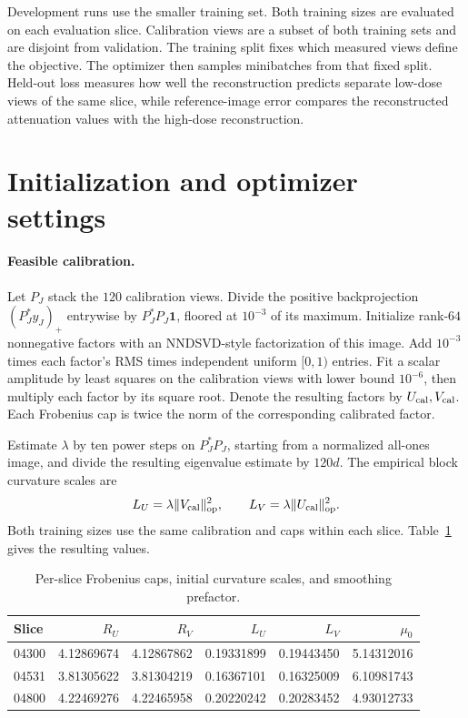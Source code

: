 \documentclass[11pt]{article}
\begin{document}
Development runs use the smaller training set. Both training sizes are evaluated on each evaluation slice. Calibration views are a subset of both training sets and are disjoint from validation. The training split fixes which measured views define the objective. The optimizer then samples minibatches from that fixed split. Held-out loss measures how well the reconstruction predicts separate low-dose views of the same slice, while reference-image error compares the reconstructed attenuation values with the high-dose reconstruction.

\section{Initialization and optimizer settings}
\label{sec:ct-settings}

\paragraph{Feasible calibration.}
Let \(P_J\) stack the \(120\) calibration views. Divide the positive backprojection \((P_J^\ast y_J)_+\) entrywise by \(P_J^\ast P_J\mathbf{1}\), floored at \(10^{-3}\) of its maximum. Initialize rank-\(64\) nonnegative factors with an NNDSVD-style factorization of this image. Add \(10^{-3}\) times each factor's RMS times independent uniform \([0,1)\) entries. Fit a scalar amplitude by least squares on the calibration views with lower bound \(10^{-6}\), then multiply each factor by its square root. Denote the resulting factors by \(U_{\rm cal},V_{\rm cal}\). Each Frobenius cap is twice the norm of the corresponding calibrated factor.

Estimate \(\lambda\) by ten power steps on \(P_J^\ast P_J\), starting from a normalized all-ones image, and divide the resulting eigenvalue estimate by \(120d\). The empirical block curvature scales are
\[
  L_U=\lambda\|V_{\rm cal}\|_{\rm op}^2,\qquad
  L_V=\lambda\|U_{\rm cal}\|_{\rm op}^2 .
\]
Both training sizes use the same calibration and caps within each slice. Table~\ref{tab:ct-curvature} gives the resulting values.

\begin{table}[htbp]
  \centering
  \caption{Per-slice Frobenius caps, initial curvature scales, and smoothing prefactor.}
  \label{tab:ct-curvature}
  \begin{tabular}{@{}lrrrrr@{}}
    \toprule
    Slice & \(R_U\) & \(R_V\) & \(L_U\) & \(L_V\) & \(\mu_0\) \\
    \midrule
    04300 & 4.12869674 & 4.12867862 & 0.19331899 & 0.19443450 & 5.14312016 \\
    04531 & 3.81305622 & 3.81304219 & 0.16367101 & 0.16325009 & 6.10981743 \\
    04800 & 4.22469276 & 4.22465958 & 0.20220242 & 0.20283452 & 4.93012733 \\
    \bottomrule
  \end{tabular}
\end{table}
\end{document}
